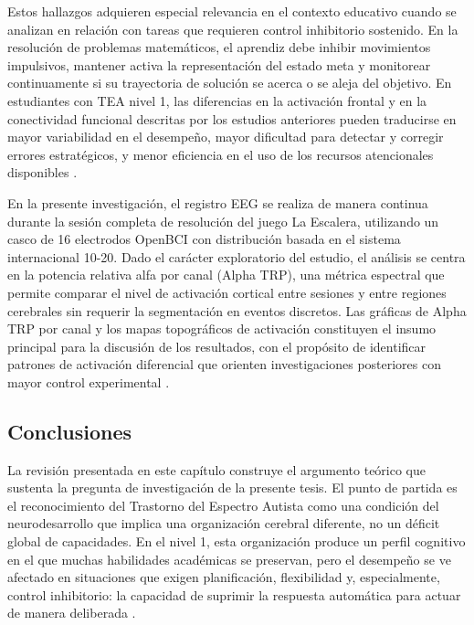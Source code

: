 \documentclass{book}
\begin{document}
Estos hallazgos adquieren especial relevancia en el 
contexto educativo cuando se analizan en relación con 
tareas que requieren control inhibitorio sostenido. 
En la resolución de problemas matemáticos, el aprendiz 
debe inhibir movimientos impulsivos, mantener activa 
la representación del estado meta y monitorear 
continuamente si su trayectoria de solución se acerca 
o se aleja del objetivo. En estudiantes con TEA nivel 
1, las diferencias en la activación frontal y en la 
conectividad funcional descritas por los estudios 
anteriores pueden traducirse en mayor variabilidad en 
el desempeño, mayor dificultad para detectar y 
corregir errores estratégicos, y menor eficiencia 
en el uso de los recursos atencionales disponibles 
\cite{Geurts2009, Hill2004, Kana2011}.

En la presente investigación, el registro EEG se 
realiza de manera continua durante la sesión completa 
de resolución del juego La Escalera, utilizando un 
casco de 16 electrodos OpenBCI con distribución basada 
en el sistema internacional 10-20. Dado el carácter 
exploratorio del estudio, el análisis se centra en 
la potencia relativa alfa por canal (Alpha TRP), una 
métrica espectral que permite comparar el nivel de 
activación cortical entre sesiones y entre regiones 
cerebrales sin requerir la segmentación en eventos 
discretos. Las gráficas de Alpha TRP por canal y los 
mapas topográficos de activación constituyen el insumo 
principal para la discusión de los resultados, con 
el propósito de identificar patrones de activación 
diferencial que orienten investigaciones posteriores 
con mayor control experimental \cite{Klimesch1999, 
Luck2014, Delorme2004}.


\subsection{Conclusiones}

La revisión presentada en este capítulo construye el argumento 
teórico que sustenta la pregunta de investigación de la 
presente tesis. El punto de partida es el reconocimiento 
del Trastorno del Espectro Autista como una condición del 
neurodesarrollo que implica una organización cerebral 
diferente, no un déficit global de capacidades. En el 
nivel 1, esta organización produce un perfil cognitivo 
en el que muchas habilidades académicas se preservan, 
pero el desempeño se ve afectado en situaciones que 
exigen planificación, flexibilidad y, especialmente, 
control inhibitorio: la capacidad de suprimir la 
respuesta automática para actuar de manera deliberada 
\cite{Diamond2013, Hill2004, Geurts2009}.
\end{document}

